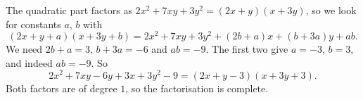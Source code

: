 The quadratic part factors as $2x^2+7xy+3y^2=(2x+y)(x+3y)$, so we look for constants $a$, $b$ with
\[(2x+y+a)(x+3y+b)=2x^2+7xy+3y^2+(2b+a)x+(b+3a)y+ab.\]
We need $2b+a=3$, $b+3a=-6$ and $ab=-9$. The first two give $a=-3$, $b=3$, and indeed $ab=-9$. So
\[2x^2+7xy-6y+3x+3y^2-9=\boxed{(2x+y-3)(x+3y+3)}.\]
Both factors are of degree $1$, so the factorisation is complete.
